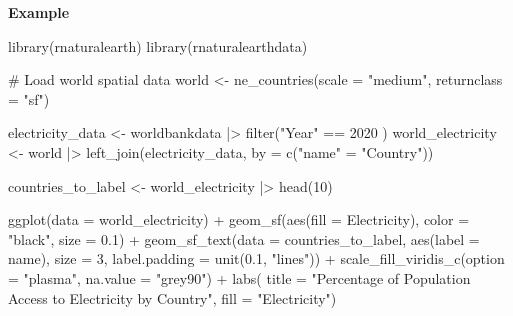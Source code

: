 \documentclass[
  letterpaper,
  DIV=11,
  numbers=noendperiod]{scrreprt}
\newenvironment{Shaded}{\begin{snugshade}}{\end{snugshade}}
\newcommand{\AttributeTok}[1]{\textcolor[rgb]{0.40,0.45,0.13}{#1}}
\newcommand{\CommentTok}[1]{\textcolor[rgb]{0.37,0.37,0.37}{#1}}
\newcommand{\DecValTok}[1]{\textcolor[rgb]{0.68,0.00,0.00}{#1}}
\newcommand{\FloatTok}[1]{\textcolor[rgb]{0.68,0.00,0.00}{#1}}
\newcommand{\FunctionTok}[1]{\textcolor[rgb]{0.28,0.35,0.67}{#1}}
\newcommand{\NormalTok}[1]{\textcolor[rgb]{0.00,0.23,0.31}{#1}}
\newcommand{\OtherTok}[1]{\textcolor[rgb]{0.00,0.23,0.31}{#1}}
\newcommand{\SpecialCharTok}[1]{\textcolor[rgb]{0.37,0.37,0.37}{#1}}
\newcommand{\StringTok}[1]{\textcolor[rgb]{0.13,0.47,0.30}{#1}}
\begin{document}
\textbf{Example}

\begin{Shaded}
\begin{Highlighting}[]
\FunctionTok{library}\NormalTok{(rnaturalearth)}
\FunctionTok{library}\NormalTok{(rnaturalearthdata)}

\CommentTok{\# Load world spatial data}
\NormalTok{world }\OtherTok{\textless{}{-}} \FunctionTok{ne\_countries}\NormalTok{(}\AttributeTok{scale =} \StringTok{"medium"}\NormalTok{, }\AttributeTok{returnclass =} \StringTok{"sf"}\NormalTok{)}

\NormalTok{electricity\_data }\OtherTok{\textless{}{-}}\NormalTok{ worldbankdata }\SpecialCharTok{|\textgreater{}} \FunctionTok{filter}\NormalTok{(}\StringTok{"Year"} \SpecialCharTok{==} \DecValTok{2020}\NormalTok{ )}
\NormalTok{world\_electricity }\OtherTok{\textless{}{-}}\NormalTok{ world }\SpecialCharTok{|\textgreater{}} 
  \FunctionTok{left\_join}\NormalTok{(electricity\_data, }\AttributeTok{by =} \FunctionTok{c}\NormalTok{(}\StringTok{"name"} \OtherTok{=} \StringTok{"Country"}\NormalTok{))}

\NormalTok{countries\_to\_label }\OtherTok{\textless{}{-}}\NormalTok{ world\_electricity }\SpecialCharTok{|\textgreater{}} \FunctionTok{head}\NormalTok{(}\DecValTok{10}\NormalTok{)}

\FunctionTok{ggplot}\NormalTok{(}\AttributeTok{data =}\NormalTok{ world\_electricity) }\SpecialCharTok{+}
  \FunctionTok{geom\_sf}\NormalTok{(}\FunctionTok{aes}\NormalTok{(}\AttributeTok{fill =}\NormalTok{ Electricity), }\AttributeTok{color =} \StringTok{"black"}\NormalTok{, }\AttributeTok{size =} \FloatTok{0.1}\NormalTok{) }\SpecialCharTok{+}
   \FunctionTok{geom\_sf\_text}\NormalTok{(}\AttributeTok{data =}\NormalTok{ countries\_to\_label, }\FunctionTok{aes}\NormalTok{(}\AttributeTok{label =}\NormalTok{ name), }\AttributeTok{size =} \DecValTok{3}\NormalTok{, }\AttributeTok{label.padding =} \FunctionTok{unit}\NormalTok{(}\FloatTok{0.1}\NormalTok{, }\StringTok{"lines"}\NormalTok{)) }\SpecialCharTok{+}
  \FunctionTok{scale\_fill\_viridis\_c}\NormalTok{(}\AttributeTok{option =} \StringTok{"plasma"}\NormalTok{, }\AttributeTok{na.value =} \StringTok{"grey90"}\NormalTok{) }\SpecialCharTok{+}
  \FunctionTok{labs}\NormalTok{(}
    \AttributeTok{title =} \StringTok{"Percentage of Population Access to Electricity by Country"}\NormalTok{,}
    \AttributeTok{fill =} \StringTok{"Electricity"}\NormalTok{)}
\end{Highlighting}
\end{Shaded}
\end{document}
